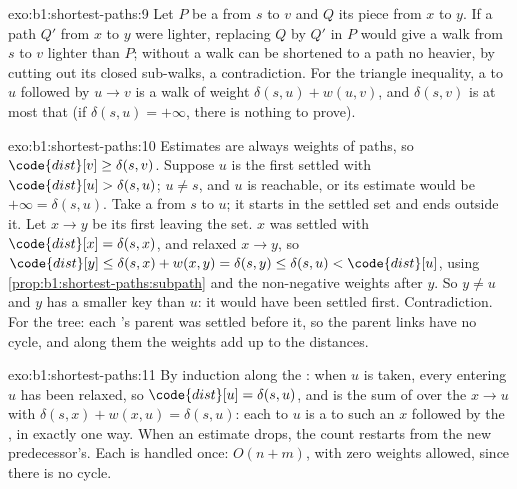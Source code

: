 \begin{solution}{exo:b1:shortest-paths:9}
Let $P$ be a  from $s$ to $v$ and $Q$ its piece from $x$ to $y$. If a path $Q'$ from $x$ to $y$ were lighter,
replacing $Q$ by $Q'$ in $P$ would give a walk from $s$ to $v$ lighter than $P$; without  a walk can be
shortened to a path no heavier, by cutting out its closed sub-walks, a contradiction. For the triangle inequality, a
 to $u$ followed by $u \to v$ is a walk of weight $\delta(s, u) + w(u, v)$, and $\delta(s, v)$ is at most
that (if $\delta(s, u) = +\infty$, there is nothing to prove).
\end{solution}

\begin{solution}{exo:b1:shortest-paths:10}
Estimates are always weights of paths, so $\code{dist}[v] \geq \delta(s, v)$. Suppose $u$ is the first  settled
with $\code{dist}[u] > \delta(s, u)$; $u \neq s$, and $u$ is reachable, or its estimate would be $+\infty = \delta(s, u)$.
Take a  from $s$ to $u$; it starts in the settled set and ends outside it. Let $x \to y$ be its first 
leaving the set. $x$ was settled with $\code{dist}[x] = \delta(s, x)$, and relaxed $x \to y$, so $\code{dist}[y] \leq
\delta(s, x) + w(x, y) = \delta(s, y) \leq \delta(s, u) < \code{dist}[u]$, using \cref{prop:b1:shortest-paths:subpath}
and the non-negative weights after $y$. So $y \neq u$ and $y$ has a smaller key than $u$: it would have been settled
first. Contradiction. For the tree: each 's parent was settled before it, so the parent links have no cycle, and
along them the weights add up to the distances.
\end{solution}

\begin{solution}{exo:b1:shortest-paths:11}
By induction along the : when $u$ is taken, every  entering $u$ has been relaxed, so
$\code{dist}[u] = \delta(s, u)$, and  is the sum of  over the  $x \to u$ with $\delta(s,
x) + w(x, u) = \delta(s, u)$: each  to $u$ is a  to such an $x$ followed by the , in exactly
one way. When an estimate drops, the count restarts from the new predecessor's. Each  is handled once:
$O(n + m)$, with zero weights allowed, since there is no cycle.
\end{solution}

